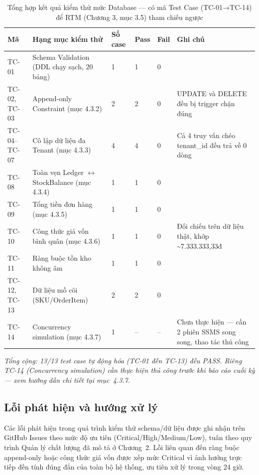 \begin{table}[htbp]
    \centering
    \small
    \caption{Tổng hợp kết quả kiểm thử mức Database — có mã Test Case (TC-01→TC-14) để RTM (Chương 3, mục 3.5) tham chiếu ngược}
    \begin{tabularx}{\textwidth}{|p{1.6cm}|Y|p{1.3cm}|p{1cm}|p{1cm}|Y|}
        \hline
        \textbf{Mã} & \textbf{Hạng mục kiểm thử} & \textbf{Số case} & \textbf{Pass} & \textbf{Fail} & \textbf{Ghi chú} \\
        \hline
        TC-01 & Schema Validation (DDL chạy sạch, 20 bảng) & 1 & 1 & 0 & \\
        \hline
        TC-02, TC-03 & Append-only Constraint (mục 4.3.2) & 2 & 2 & 0 & UPDATE và DELETE đều bị trigger chặn đúng \\
        \hline
        TC-04–TC-07 & Cô lập dữ liệu đa Tenant (mục 4.3.3) & 4 & 4 & 0 & Cả 4 truy vấn chéo tenant\_id đều trả về 0 dòng \\
        \hline
        TC-08 & Toàn vẹn Ledger $\leftrightarrow$ StockBalance (mục 4.3.4) & 1 & 1 & 0 & \\
        \hline
        TC-09 & Tổng tiền đơn hàng (mục 4.3.5) & 1 & 1 & 0 & \\
        \hline
        TC-10 & Công thức giá vốn bình quân (mục 4.3.6) & 1 & 1 & 0 & Đối chiếu trên dữ liệu thật, khớp \textasciitilde 7.333.333,33đ \\
        \hline
        TC-11 & Ràng buộc tồn kho không âm & 1 & 1 & 0 & \\
        \hline
        TC-12, TC-13 & Dữ liệu mồ côi (SKU/OrderItem) & 2 & 2 & 0 & \\
        \hline
        TC-14 & Concurrency simulation (mục 4.3.7) & 1 & -- & -- & Chưa thực hiện — cần 2 phiên SSMS song song, thao tác thủ công \\
        \hline
    \end{tabularx}
\end{table}

\textit{Tổng cộng: 13/13 test case tự động hóa (TC-01 đến TC-13) đều PASS. Riêng TC-14 (Concurrency simulation) cần thực hiện thủ công trước khi báo cáo cuối kỳ — xem hướng dẫn chi tiết tại mục~4.3.7.}

\subsection{Lỗi phát hiện và hướng xử lý}
Các lỗi phát hiện trong quá trình kiểm thử schema/dữ liệu được ghi nhận trên GitHub Issues theo mức độ ưu tiên (Critical/High/Medium/Low), tuân theo quy trình Quản lý chất lượng đã mô tả ở Chương~2. Lỗi liên quan đến ràng buộc append-only hoặc công thức giá vốn được xếp mức Critical vì ảnh hưởng trực tiếp đến tính đúng đắn của toàn bộ hệ thống, ưu tiên xử lý trong vòng 24 giờ.
